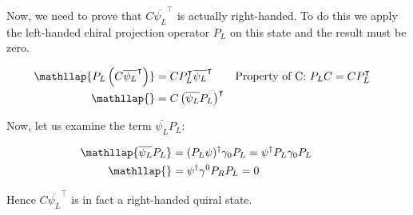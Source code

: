 Now, we need to prove that $C \overline{\psi_L}^\intercal$ is actually right-handed. To do this we apply the left-handed chiral projection operator $P_L$ on this state and
the result must be zero.

\begin{align}
  &\begin{aligned}
     \mathllap{P_L \left( C \overline{\psi_L}^\intercal \right)} &= C P_L^\intercal \overline{\psi_L}^\intercal &\text{Property of C: $P_LC = C P_L^\intercal$}\\        
     \mathllap{} &= C \left( \overline{\psi_L}P_L \right)^\intercal  
  &\end{aligned}
\end{align}

Now, let us examine the term $\overline{\psi_L}P_L$:
 

\begin{align}
  &\begin{aligned}
    \mathllap{\overline{\psi_L}P_L} &= (P_L \psi)^\dagger \gamma_0 P_L = \psi^\dagger P_L \gamma_0 P_L\\
    \mathllap{} &= \psi^\dagger \gamma^0 P_R P_L = 0
    &\end{aligned}
\end{align}

Hence $C \overline{\psi_L}^\intercal$ is in fact a right-handed quiral state. 
\\






